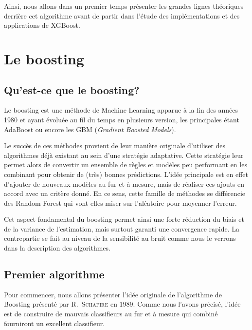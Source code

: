 \documentclass[11pt,a4paper]{article}
\begin{document}
Ainsi, nous allons dans un premier temps présenter les grandes lignes théoriques derrière cet algorithme avant de partir dans l'étude des implémentations et des applications de XGBoost.

\section{Le boosting}
\subsection{Qu'est-ce que le boosting?}
Le boosting est une méthode de Machine Learning apparue à la fin des années 1980 et ayant évoluée au fil du temps en plusieurs version, les principales étant AdaBoost ou encore les GBM (\textit{Gradient Boosted Models}). 

Le succès de ces méthodes provient de leur manière originale d'utiliser des algorithmes déjà existant au sein d'une stratégie adaptative. Cette stratégie leur permet alors de convertir un ensemble de règles et modèles peu performant en les combinant pour obtenir de (très) bonnes prédictions. L'idée principale est en effet d'ajouter de nouveaux modèles au fur et à mesure, mais de réaliser ces ajouts en accord avec un critère donné. En ce sens, cette famille de méthodes se différencie des Random Forest qui vont elles miser sur l'aléatoire pour moyenner l'erreur.

Cet aspect fondamental du boosting permet ainsi une forte réduction du biais et de la variance de l'estimation, mais surtout garanti une convergence rapide. La contrepartie se fait au niveau de la sensibilité au bruit comme nous le verrons dans la description des algorithmes.

\subsection{Premier algorithme}
\label{sec:boosting}
Pour commencer, nous allons présenter l'idée originale de l'algorithme de Boosting présenté par R.~\textsc{Schapire} en 1989. Comme nous l'avons précisé, l'idée est de construire de \og mauvais\fg{} classifieurs au fur et à mesure qui combiné fourniront un excellent classifieur.
\end{document}

